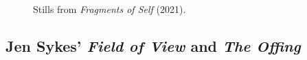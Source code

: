 \begin{figure}[!htbp]
    \centering
    \hfill
    \hfill
    \caption[Stills from \textit{Fragments of Self}]{Stills from \textit{Fragments of Self} (2021).}
    \label{fig:c7:fragments}
 \end{figure}

\subsection{Jen Sykes' \textit{Field of View} and \textit{The Offing}}

